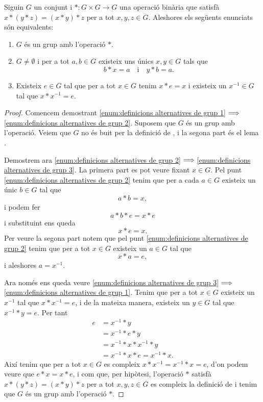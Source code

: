 \documentclass[../../Main.tex]{subfiles}
\begin{document}
	\begin{theorem}
		\label{thm:definicions alternatives de grup}
		Siguin \(G\) un conjunt i \(\ast\colon G\times G\to G\) una operació binària que satisfà
		\(x\ast(y\ast z)=(x\ast y)\ast z\) per a tot \(x,y,z\in G\). Aleshores els següents enunciats són equivalents:
		\begin{enumerate}
			\item\label{enum:definicions alternatives de grup 1} \(G\) és un grup amb l'operació \(\ast\).
			\item\label{enum:definicions alternatives de grup 2} \(G\neq\emptyset\) i per a tot \(a,b\in G\) existeix uns únics \(x,y\in G\) tals que
			\[b\ast x=a\quad\text{i}\quad y\ast b=a.\]
			\item\label{enum:definicions alternatives de grup 3} Existeix \(e\in G\) tal que per a tot \(x\in G\) tenim \(x\ast e=x\) i existeix un \(x^{-1}\in G\) tal que \(x\ast x^{-1}=e\).
		\end{enumerate}
		\begin{proof}
			Comencem demostrant \eqref{enum:definicions alternatives de grup 1}\(\implies\)\eqref{enum:definicions alternatives de grup 2}. Suposem que \(G\) és un grup amb l'operació. Veiem que \(G\) no és buit per la definició de , i la segona part és el lema .
			
			Demostrem ara \eqref{enum:definicions alternatives de grup 2}\(\implies\)\eqref{enum:definicions alternatives de grup 3}. La primera part es pot veure fixant \(x\in G\). Pel punt \eqref{enum:definicions alternatives de grup 2} tenim que per a cada \(a\in G\) existeix un únic \(b\in G\) tal que
			\[a\ast b=x,\]
			i podem fer
			\[a\ast b\ast e=x\ast e\]
			i substituint ens queda
			\[x\ast e=x.\]
			Per veure la segona part notem que pel punt \eqref{enum:definicions alternatives de grup 2} tenim que per a tot \(x\in G\) existeix un \(a\in G\) tal que
			\[x\ast a=e,\]
			i aleshores \(a=x^{-1}\).
			
			Ara només ens queda veure \eqref{enum:definicions alternatives de grup 3}\(\implies\)\eqref{enum:definicions alternatives de grup 1}. Tenim que per a tot \(x\in G\) existeix un \(x^{-1}\) tal que \(x\ast x^{-1}=e\), i de la mateixa manera, existeix un \(y\in G\) tal que \(x^{-1}\ast y=e\). Per tant
			\begin{align*}
			e&=x^{-1}\ast y\\
			&=x^{-1}\ast e\ast y\\
			&=x^{-1}\ast x\ast x^{-1}\ast y\\
			&=x^{-1}\ast x\ast e=x^{-1}\ast x.
			\end{align*}
			Així tenim que per a tot \(x\in G\) es compleix \(x\ast x^{-1}=x^{-1}\ast x=e\), d'on podem veure que \(e\ast x=x\ast e\), i com que, per hipòtesi, l'operació \(\ast\) satisfà \(x\ast(y\ast z)=(x\ast y)\ast z\) per a tot \(x,y,z\in G\) es compleix la definició de  i tenim que \(G\) és un grup amb l'operació \(\ast\).
			

\end{proof}
\end{theorem}
\end{document}
